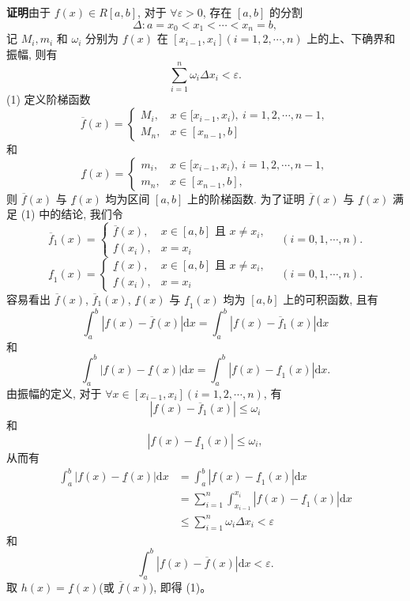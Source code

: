 \documentclass[UTF8, 12pt, fontset=fandol, oneside]{ctexart}
\begin{document}
\noindent\textbf{证明}\quad 由于 $f(x)\in R[a,b]$, 对于 $\forall\varepsilon>0$, 存在 $[a,b]$ 的分割
\[
  \Delta:a=x_0<x_1<\cdots<x_n=b,
\]
记 $M_i,m_i$ 和 $\omega_i$ 分别为 $f(x)$ 在 $[x_{i-1},x_i](i=1,2,\cdots,n)$ 上的上、下确界和振幅, 则有
\[
  \sum_{i=1}^n\omega_i\Delta x_i<\varepsilon.
\]
(1) 定义阶梯函数
\[
  \overline f(x)=
  \begin{cases}
    M_i, & x\in[x_{i-1},x_i),\ i=1,2,\cdots,n-1,\\
    M_n, & x\in[x_{n-1},b]
  \end{cases}
\]
和
\[
  \underline f(x)=
  \begin{cases}
    m_i, & x\in[x_{i-1},x_i),\ i=1,2,\cdots,n-1,\\
    m_n, & x\in[x_{n-1},b],
  \end{cases}
\]
则 $\overline f(x)$ 与 $\underline f(x)$ 均为区间 $[a,b]$ 上的阶梯函数. 为了证明 $\overline f(x)$ 与 $\underline f(x)$ 满足 (1) 中的结论, 我们令
\[
  \overline f_1(x)=
  \begin{cases}
    \overline f(x), & x\in[a,b]\text{ 且 }x\neq x_i,\\
    f(x_i), & x=x_i
  \end{cases}
  \quad(i=0,1,\cdots,n).
\]
\[
  \underline f_1(x)=
  \begin{cases}
    \underline f(x), & x\in[a,b]\text{ 且 }x\neq x_i,\\
    f(x_i), & x=x_i
  \end{cases}
  \quad(i=0,1,\cdots,n).
\]
容易看出 $\overline f(x)$, $\overline f_1(x)$, $\underline f(x)$ 与 $\underline f_1(x)$ 均为 $[a,b]$ 上的可积函数, 且有
\[
  \int_a^b |f(x)-\overline f(x)|\mathrm dx
  =\int_a^b |f(x)-\overline f_1(x)|\mathrm dx
\]
和
\[
  \int_a^b |f(x)-\underline f(x)|\mathrm dx
  =\int_a^b |f(x)-\underline f_1(x)|\mathrm dx.
\]
由振幅的定义, 对于 $\forall x\in[x_{i-1},x_i](i=1,2,\cdots,n)$, 有
\begin{equation}
  |f(x)-\overline f_1(x)|\leq\omega_i
  \tag{7.3.2}
\end{equation}
和
\begin{equation}
  |f(x)-\underline f_1(x)|\leq\omega_i,
  \tag{7.3.3}
\end{equation}
从而有
\[
\begin{aligned}
  \int_a^b |f(x)-\underline f(x)|\mathrm dx
  &=\int_a^b |f(x)-\underline f_1(x)|\mathrm dx\\
  &=\sum_{i=1}^n\int_{x_{i-1}}^{x_i}|f(x)-\underline f_1(x)|\mathrm dx\\
  &\leq \sum_{i=1}^n\omega_i\Delta x_i<\varepsilon
\end{aligned}
\]
和
\[
  \int_a^b |f(x)-\overline f(x)|\mathrm dx<\varepsilon.
\]
取 $h(x)=\underline f(x)$(或 $\overline f(x)$), 即得 (1)。
\end{document}
